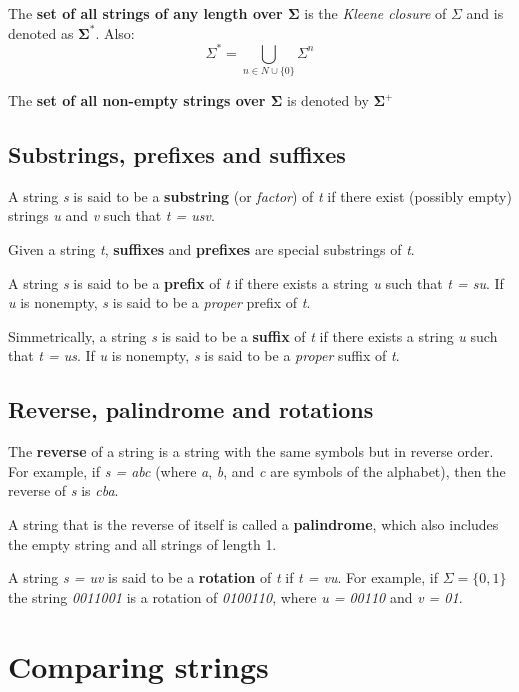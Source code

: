 \documentclass[12pt, letterpaper]{article}
\begin{document}
The \textbf{set of all strings of any length over $\mathbf{\Sigma}$} is the \emph{Kleene closure} of $\Sigma$ and is denoted as $\mathbf{\Sigma^*}$. Also: 
$$
\Sigma^* = \bigcup_{n \in {N} \cup \{0\}} \Sigma^n
$$

The \textbf{set of all non-empty strings over $\mathbf{\Sigma}$} is denoted by $\mathbf{\Sigma^+}$

\subsection{Substrings, prefixes and suffixes}

A string \emph{s} is said to be a \textbf{substring} (or \emph{factor}) of \emph{t} if there exist (possibly empty) strings \emph{u} and \emph{v} such that \emph{t = usv}.

Given a string \emph{t}, \textbf{suffixes} and \textbf{prefixes} are special substrings of \emph{t}.

A string \emph{s} is said to be a \textbf{prefix} of \emph{t} if there exists a string \emph{u} such that \emph{t = su}. If \emph{u} is nonempty, \emph{s} is said to be a \emph{proper} prefix of \emph{t}.

Simmetrically, a string \emph{s} is said to be a \textbf{suffix} of \emph{t} if there exists a string \emph{u} such that \emph{t = us}. If \emph{u} is nonempty, \emph{s} is said to be a \emph{proper} suffix of \emph{t}.

\subsection{Reverse, palindrome and rotations}

The \textbf{reverse} of a string is a string with the same symbols but in reverse order. For example, if \emph{s = abc} (where \emph{a}, \emph{b}, and \emph{c} are symbols of the alphabet), then the reverse of \emph{s} is \emph{cba}.

A string that is the reverse of itself is called a \textbf{palindrome}, which also includes the empty string and all strings of length 1.

A string \emph{s = uv} is said to be a \textbf{rotation} of \emph{t} if \emph{t = vu}. For example, if $\Sigma = \{0, 1\}$ the string \emph{0011001} is a rotation of \emph{0100110}, where \emph{u = 00110} and \emph{v = 01}.

\section{Comparing strings}
\end{document}
